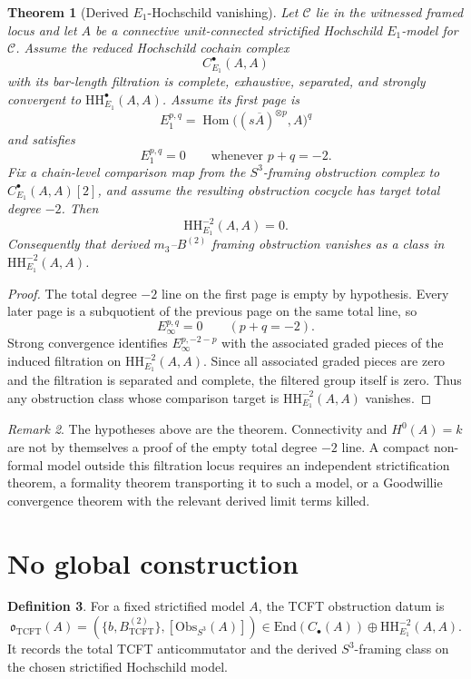 \documentclass[11pt]{amsart}
\providecommand{\cC}{\mathcal{C}}
\providecommand{\HH}{\mathrm{HH}}
\providecommand{\TCFT}{\mathrm{TCFT}}
\newtheorem{theorem}{Theorem}
\theoremstyle{definition}
\newtheorem{definition}[theorem]{Definition}
\theoremstyle{remark}
\newtheorem{remark}[theorem]{Remark}
\begin{document}
\begin{theorem}[Derived \(E_1\)-Hochschild vanishing]
Let \(\cC\) lie in the witnessed framed locus and let \(A\) be a
connective unit-connected strictified Hochschild \(E_1\)-model for \(\cC\).
Assume the reduced Hochschild cochain complex
\[
        C^\bullet_{E_1}(A,A)
\]
with its bar-length filtration is complete, exhaustive, separated, and
strongly convergent to \(\HH^\bullet_{E_1}(A,A)\).  Assume its first page is
\[
        E_1^{p,q}
        =
        \operatorname{Hom}\bigl((s\overline A)^{\otimes p},A\bigr)^q
\]
and satisfies
\[
        E_1^{p,q}=0\qquad\text{whenever }p+q=-2 .
\]
Fix a chain-level comparison map from the \(S^3\)-framing obstruction
complex to \(C^\bullet_{E_1}(A,A)[2]\), and assume the resulting obstruction
cocycle has target total degree \(-2\).
Then
\[
        \HH^{-2}_{E_1}(A,A)=0 .
\]
Consequently that derived \(m_3\)--\(B^{(2)}\) framing obstruction vanishes
as a class in \(\HH^{-2}_{E_1}(A,A)\).
\end{theorem}

\begin{proof}
The total degree \(-2\) line on the first page is empty by hypothesis.
Every later page is a subquotient of the previous page on the same total
line, so
\[
        E_\infty^{p,q}=0\qquad(p+q=-2).
\]
Strong convergence identifies \(E_\infty^{p,-2-p}\) with the associated
graded pieces of the induced filtration on \(\HH^{-2}_{E_1}(A,A)\).  Since
all associated graded pieces are zero and the filtration is separated and
complete, the filtered group itself is zero.  Thus any obstruction class
whose comparison target is \(\HH^{-2}_{E_1}(A,A)\) vanishes.
\end{proof}

\begin{remark}
The hypotheses above are the theorem.  Connectivity and \(H^0(A)=k\) are
not by themselves a proof of the empty total degree \(-2\) line.  A compact
non-formal model outside this filtration locus requires an independent
strictification theorem, a formality theorem transporting it to such a
model, or a Goodwillie convergence theorem with the relevant derived limit
terms killed.
\end{remark}

\section{No global construction}

\begin{definition}
For a fixed strictified model \(A\), the TCFT obstruction datum is
\[
        \mathfrak{o}_{\TCFT}(A)
        =
        \left(
        \{b,B^{(2)}_{\TCFT}\},
        [\mathrm{Obs}_{S^3}(A)]
        \right)
        \in
        \mathrm{End}(C_\bullet(A))
        \oplus
        \HH^{-2}_{E_1}(A,A).
\]
It records the total TCFT anticommutator and the derived
\(S^3\)-framing class on the chosen strictified Hochschild model.
\end{definition}
\end{document}
